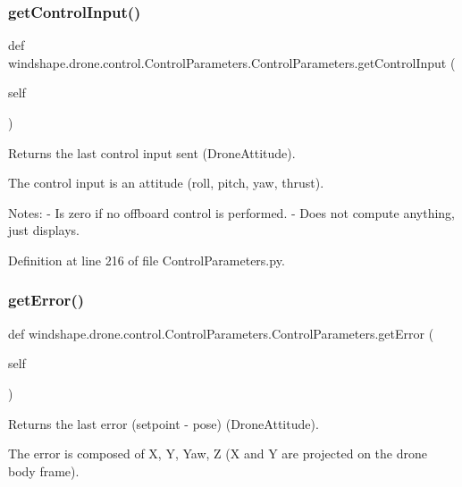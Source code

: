 \subsubsection{\texorpdfstring{get\+Control\+Input()}{getControlInput()}}
{\footnotesize\ttfamily def windshape.\+drone.\+control.\+Control\+Parameters.\+Control\+Parameters.\+get\+Control\+Input (\begin{DoxyParamCaption}\item[{}]{self }\end{DoxyParamCaption})}

\begin{DoxyVerb}Returns the last control input sent (DroneAttitude).

The control input is an attitude (roll, pitch, yaw, thrust).

Notes:
    - Is zero if no offboard control is performed.
    - Does not compute anything, just displays.
\end{DoxyVerb}
 

Definition at line 216 of file Control\+Parameters.\+py.

\mbox{\label{classwindshape_1_1drone_1_1control_1_1_control_parameters_1_1_control_parameters_af13e6505965d33657f24bf0f36397331}} 
\subsubsection{\texorpdfstring{get\+Error()}{getError()}}
{\footnotesize\ttfamily def windshape.\+drone.\+control.\+Control\+Parameters.\+Control\+Parameters.\+get\+Error (\begin{DoxyParamCaption}\item[{}]{self }\end{DoxyParamCaption})}

\begin{DoxyVerb}Returns the last error (setpoint - pose) (DroneAttitude).

The error is composed of X, Y, Yaw, Z (X and Y are
projected on the drone body frame).
\end{DoxyVerb}
 

